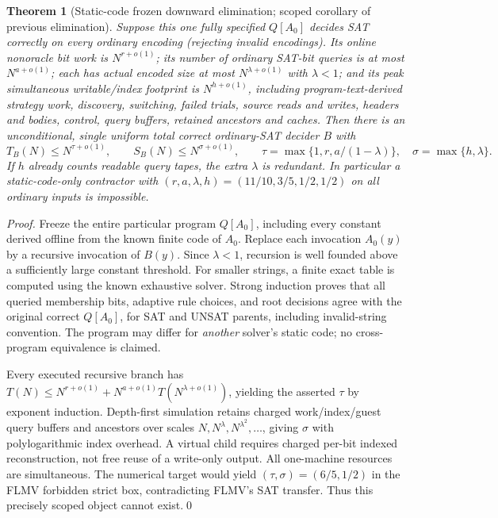 \documentclass[11pt]{article}
\newtheorem{theorem}{Theorem}
\begin{document}
\begin{theorem}[Static-code frozen downward elimination; scoped corollary of previous elimination]
Suppose this one fully specified $Q[A_0]$ decides SAT correctly on \emph{every ordinary encoding} (rejecting invalid encodings). Its online nonoracle bit work is $N^{r+o(1)}$; its number of ordinary SAT-bit queries is at most $N^{a+o(1)}$; each has actual encoded size at most $N^{\lambda+o(1)}$ with $\lambda<1$; and its peak simultaneous writable/index footprint is $N^{h+o(1)}$, including program-text-derived strategy work, discovery, switching, failed trials, source reads and writes, headers and bodies, control, query buffers, retained ancestors and caches. Then there is an \emph{unconditional}, single uniform total correct ordinary-SAT decider $B$ with
\[
T_B(N)\le N^{\tau+o(1)},\qquad S_B(N)\le N^{\sigma+o(1)},\qquad
\tau=\max\{1,r,a/(1-\lambda)\},\quad \sigma=\max\{h,\lambda\}.
\]
If $h$ already counts readable query tapes, the extra $\lambda$ is redundant. In particular a static-code-only contractor with $(r,a,\lambda,h)=(11/10,3/5,1/2,1/2)$ on all ordinary inputs is impossible.
\end{theorem}
\begin{proof}
Freeze the entire particular program $Q[A_0]$, including every constant derived offline from the known finite code of $A_0$. Replace each invocation $A_0(y)$ by a recursive invocation of $B(y)$. Since $\lambda<1$, recursion is well founded above a sufficiently large constant threshold. For smaller strings, a finite exact table is computed using the known exhaustive solver. Strong induction proves that all queried membership bits, adaptive rule choices, and root decisions agree with the original correct $Q[A_0]$, for SAT and UNSAT parents, including invalid-string convention. The program may differ for \emph{another} solver's static code; no cross-program equivalence is claimed.

Every executed recursive branch has $T(N)\le N^{r+o(1)}+N^{a+o(1)}T(N^{\lambda+o(1)})$, yielding the asserted $\tau$ by exponent induction. Depth-first simulation retains charged work/index/guest query buffers and ancestors over scales $N,N^\lambda,N^{\lambda^2},\ldots$, giving $\sigma$ with polylogarithmic index overhead. A virtual child requires charged per-bit indexed reconstruction, not free reuse of a write-only output. All one-machine resources are simultaneous. The numerical target would yield $(\tau,\sigma)=(6/5,1/2)$ in the FLMV forbidden strict box, contradicting FLMV's SAT transfer. Thus this precisely scoped object cannot exist.\qed
\end{proof}
\end{document}
